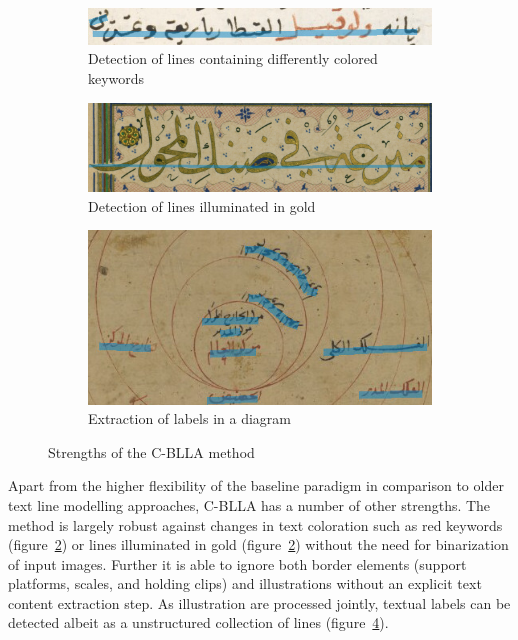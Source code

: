 \begin{figure}[ht!]
	\centering
	\begin{subfigure}[t]{\columnwidth}
		\includegraphics[width=\textwidth]{cor_color.jpg}
		\caption{Detection of lines containing differently colored keywords}
		\label{fig:cor_color}
	\end{subfigure}
	\begin{subfigure}[t]{\columnwidth}
		\includegraphics[width=\textwidth]{cor_color_gold.jpg}
		\caption{Detection of lines illuminated in gold}
		\label{fig:cor_color_gold}
	\end{subfigure}
	\begin{subfigure}[b]{\columnwidth}
		\includegraphics[width=\textwidth]{cor_diagram.jpg}
		\caption{Extraction of labels in a diagram}
		\label{fig:cor_labels}
	\end{subfigure}
	\caption{Strengths of the C-BLLA method}
\end{figure}

Apart from the higher flexibility of the baseline paradigm in comparison to
older text line modelling approaches, C-BLLA has a number of other strengths.
The method is largely robust against changes in text coloration such as red
keywords (figure~\ref{fig:cor_color_gold}) or lines illuminated in gold (figure~\ref{fig:cor_color_gold}) without the need for binarization of input images.
Further it is able to ignore both border elements (support platforms, scales,
and holding clips) and illustrations without an explicit text content
extraction step. As illustration are processed jointly, textual labels can be
detected albeit as a unstructured collection of lines (figure~\ref{fig:cor_labels}).


